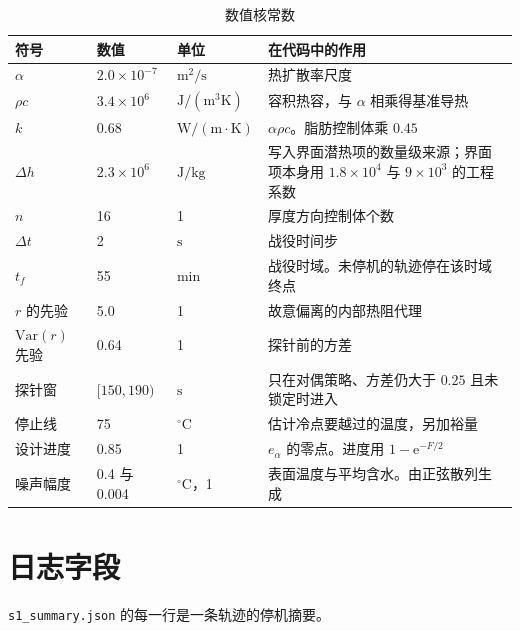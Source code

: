 \begin{table}[htbp]
\centering
\caption{数值核常数}
\label{tab:app-sym-const}
{\footnotesize\setlength{\tabcolsep}{2pt}
\begin{tabular}{@{}l p{1.5cm} l p{2.4cm}@{}}

\toprule
符号 & 数值 & 单位 & 在代码中的作用 \\
\midrule
\(\alpha\) & \(2.0\times 10^{-7}\) & \(\mathrm{m}^2/\mathrm{s}\) & 热扩散率尺度 \\
\(\rho c\) & \(3.4\times 10^{6}\) & \(\mathrm{J}/(\mathrm{m}^3\mathrm{K})\) & 容积热容，与 \(\alpha\) 相乘得基准导热 \\
\(k\) & \(0.68\) & \(\mathrm{W}/(\mathrm{m\cdot K})\) & \(\alpha\rho c\)。脂肪控制体乘 \(0.45\) \\
\(\Delta h\) & \(2.3\times 10^{6}\) & \(\mathrm{J}/\mathrm{kg}\) & 写入界面潜热项的数量级来源；界面项本身用 \(1.8\times 10^{4}\) 与 \(9\times 10^{3}\) 的工程系数 \\
\(n\) & 16 & 1 & 厚度方向控制体个数 \\
\(\Delta t\) & 2 & \(\mathrm{s}\) & 战役时间步 \\
\(t_f\) & 55 & \(\mathrm{min}\) & 战役时域。未停机的轨迹停在该时域终点 \\
\(r\) 的先验 & 5.0 & 1 & 故意偏离的内部热阻代理 \\
\(\mathrm{Var}(r)\) 先验 & 0.64 & 1 & 探针前的方差 \\
探针窗 & \([150,190)\) & \(\mathrm{s}\) & 只在对偶策略、方差仍大于 \(0.25\) 且未锁定时进入 \\
停止线 & 75 & \(^\circ\mathrm{C}\) & 估计冷点要越过的温度，另加裕量 \\
设计进度 & 0.85 & 1 & \(e_{\alpha}\) 的零点。进度用 \(1-\mathrm{e}^{-F/2}\) \\
噪声幅度 & 0.4 与 0.004 & \(^\circ\mathrm{C}\)，1 & 表面温度与平均含水。由正弦散列生成 \\
\bottomrule
\end{tabular}}
\end{table}


\section{日志字段}

\texttt{s1\_summary.json} 的每一行是一条轨迹的停机摘要。

